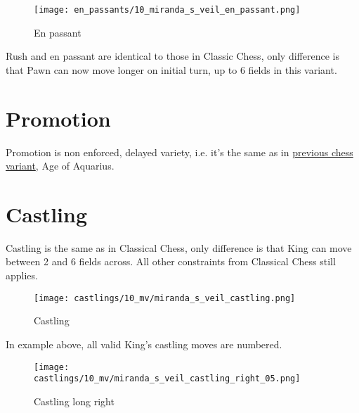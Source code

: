 \noindent
\begin{wrapfigure}[5]{l}{0.4\textwidth}
\centering
\texttt{[image: en\_passants/10\_miranda\_s\_veil\_en\_passant.png]}
\caption{En passant}
\label{fig:10_miranda_s_veil_en_passant}
\end{wrapfigure}
Rush and en passant are identical to those in Classic Chess, only difference
is that Pawn can now move longer on initial turn, up to 6 fields in this
variant.


\vspace*{9.0\baselineskip}
\section*{Promotion}
\label{sec:Miranda's veil/Promotion}

Promotion is non enforced, delayed variety, i.e. it's the same as in
\hyperref[sec:Age of Aquarius/Promotion]{previous chess variant}, Age of Aquarius.

\clearpage %

\section*{Castling}
\label{sec:Miranda's veil/Castling}

Castling is the same as in Classical Chess, only difference is that King can move between 2 and 6 fields across.
All other constraints from Classical Chess still applies.

\noindent
\begin{figure}[!h]
\texttt{[image: castlings/10\_mv/miranda\_s\_veil\_castling.png]}
\caption{Castling}
\label{fig:miranda_s_veil_castling}
\end{figure}

In example above, all valid King's castling moves are numbered.

\noindent
\begin{figure}[!h]
\texttt{[image: castlings/10\_mv/miranda\_s\_veil\_castling\_right\_05.png]}
\caption{Castling long right}
\label{fig:miranda_s_veil_castling_right_05}
\end{figure}

